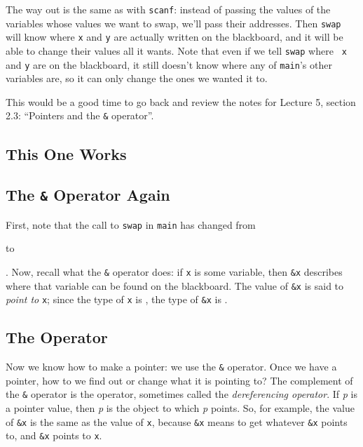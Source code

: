 The way out is the same as with {\tt scanf}:  instead of passing the
values of the variables whose values we want to swap, we'll pass their
addresses.  Then {\tt swap} will know where {\tt x} and {\tt y} are
actually written on the blackboard, and it will be able to change their
values all it wants.  Note that even if we tell {\tt swap} where {\tt
x} and {\tt y} are on the blackboard, it still doesn't know where any of
{\tt main}'s other variables are, so it can only change the ones we
wanted it to.  

This would be a good time to go back and review the notes for
Lecture 5, section 2.3: ``Pointers and the {\tt\&} operator''.

\subsection{This One Works}
\label{swap2}



\subsection{The {\tt\&} Operator Again}

First, note that the call to {\tt swap} in {\tt main} has changed from

\begin{flushleft}
\verb% swap(x, y); %
\end{flushleft}
\noindent to 
\begin{flushleft}
\verb% swap(&x, &y); %
\end{flushleft}

\noindent .   Now, recall what the {\tt\&} operator does:  if {\tt x} is
some variable, then {\tt\&x} describes where that variable can be found
on the blackboard.  The value of {\tt\&x} is said to {\em point to}\/
{\tt x}; since the type of {\tt x} is \int, the type of {\tt\&x} is
\Int.

\subsection{The {\tt *} Operator}

Now we know how to make a pointer: we use the {\tt\&} operator.  Once we
have a pointer, how to we find out or change what it is pointing to?
The complement of the {\tt\&} operator is the {\tt *} operator,
sometimes called the {\em dereferencing operator}\/.  If {\em p}\/ is a
pointer value, then {\tt *}{\em p}\/ is the object to which {\em p}\/
points.  So, for example, the value of {\tt *\&x} is the same as the
value of {\tt x}, because {\tt *\&x} means to get whatever {\tt\&x}
points to, and {\tt\&x} points to {\tt x}.


